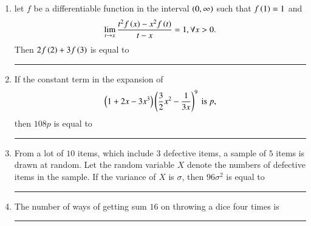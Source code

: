 \documentclass[journal]{IEEEtran}
\numberwithin{equation}{enumi}
\numberwithin{figure}{enumi}
\begin{document}
\begin{enumerate}
    \hfill{}

    \item 
    let $f$ be a differentiable function in the interval $\left(0, \infty\right)$ such that $f\left(1\right) = 1$ and 
    \begin{align*}
        \lim_{t \to x} \frac{t^2f\left(x\right) - x^2f\left(t\right)}{t - x} = 1, \forall x > 0.
    \end{align*}
    Then $2f\left(2\right) + 3f\left(3\right)$ is equal to \rule{1cm}{0.1pt}

    \hfill{}

    \item 
    If the constant term in the expansion of 
    \begin{align*}
        \left(1 + 2x - 3x^3\right)\left(\frac{3}{2}x^2 - \frac{1}{3x}\right)^9 \text{ is } p,
    \end{align*}
    then $108p$ is equal to \rule{1cm}{0.1pt}

    \hfill{}

    \item 
    From a lot of $10$ items, which include $3$ defective items, a sample of $5$ items is drawn at random. Let the random variable $X$ denote the numbers of defective items in the sample. If the variance of $X$ is $\sigma$, then $96\sigma^2$ is equal to \rule{1cm}{0.1pt}

    \hfill{}

    \item 
    The number of ways of getting sum $16$ on throwing a dice four times is \rule{1cm}{0.1pt}

    \hfill{}

\end{enumerate}
\end{document}
